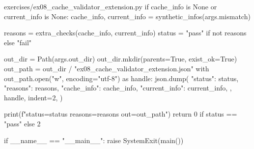 \documentclass[11pt,openany]{book}
\begin{document}
\begin{filecontents*}{exercises/ex08_cache_validator_extension.py}
    if cache_info is None or current_info is None:
        cache_info, current_info = synthetic_infos(args.mismatch)

    reasons = extra_checks(cache_info, current_info)
    status = "pass" if not reasons else "fail"

    out_dir = Path(args.out_dir)
    out_dir.mkdir(parents=True, exist_ok=True)
    out_path = out_dir / "ex08_cache_validator_extension.json"
    with out_path.open("w", encoding="utf-8") as handle:
        json.dump(
            {
                "status": status,
                "reasons": reasons,
                "cache_info": cache_info,
                "current_info": current_info,
            },
            handle,
            indent=2,
        )

    print(f"status={status} reasons={reasons} out={out_path}")
    return 0 if status == "pass" else 2


if __name__ == "__main__":
    raise SystemExit(main())
\end{filecontents*}
\end{document}
